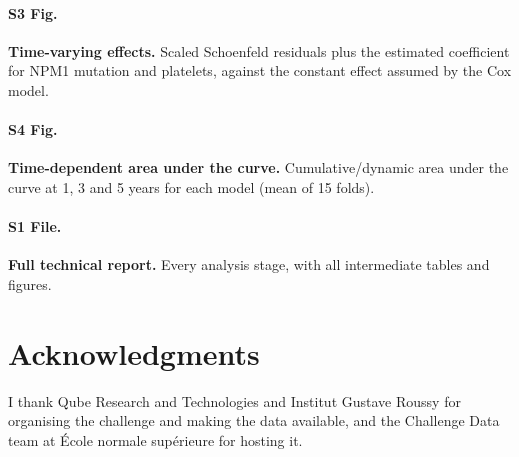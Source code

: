 \documentclass[10pt,letterpaper]{article}
\begin{document}
\paragraph*{S3 Fig.}
\label{S3_Fig}
{\bf Time-varying effects.} Scaled Schoenfeld residuals plus the estimated coefficient for
NPM1 mutation and platelets, against the constant effect assumed by the Cox model.

\paragraph*{S4 Fig.}
\label{S4_Fig}
{\bf Time-dependent area under the curve.} Cumulative/dynamic area under the curve at 1, 3
and 5 years for each model (mean of 15 folds).

\paragraph*{S1 File.}
\label{S1_File}
{\bf Full technical report.} Every analysis stage, with all intermediate tables and
figures.

\section*{Acknowledgments}
I thank Qube Research and Technologies and Institut Gustave Roussy for organising the
challenge and making the data available, and the Challenge Data team at \'Ecole normale
sup\'erieure for hosting it.

\nolinenumbers
\end{document}
